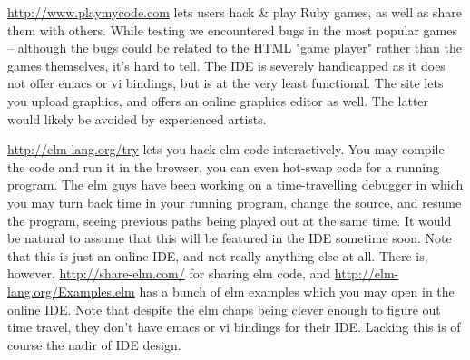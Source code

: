 \url{http://www.playmycode.com} lets users hack \& play Ruby games, as well as 
share them with others. While testing we encountered bugs in the most popular 
games -- although the bugs could be related to the HTML "game player" rather 
than the games themselves, it's hard to tell. The IDE is severely handicapped 
as it does not offer emacs or vi bindings, but is at the very least 
functional. The site lets you upload graphics, and offers an online graphics 
editor as well. The latter would likely be avoided by experienced artists.

\url{http://elm-lang.org/try} lets you hack elm code interactively. You may 
compile the code and run it in the browser, you can even hot-swap code for a 
running program. The elm guys have been working on a time-travelling debugger 
in which you may turn back time in your running program, change the source, 
and resume the program, seeing previous paths being played out at the same 
time. It would be natural to assume that this will be featured in the IDE 
sometime soon. Note that this is just an online IDE, and not really anything 
else at all. There is, however, \url{http://share-elm.com/} for sharing elm 
code, and \url{http://elm-lang.org/Examples.elm} has a bunch of elm examples 
which you may open in the online IDE. Note that despite the elm chaps being 
clever enough to figure out time travel, they don't have emacs or vi bindings 
for their IDE. Lacking this is of course the nadir of IDE design.
